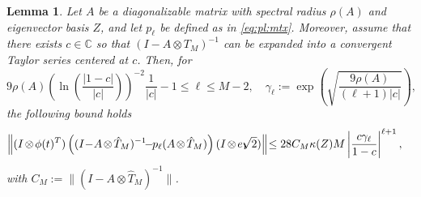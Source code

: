 \documentclass[final,1p,times,number]{elsarticle}
\theoremstyle{plain}%
\newtheorem{lem}[thm]{Lemma}
\begin{document}
\begin{lem}\label{lem:bound:mtx} Let $A$ be a diagonalizable matrix with spectral radius $\rho(A)$ and eigenvector basis $Z$, and let $p_\ell$ be defined as in \eqref{eq:pl:mtx}. Moreover, assume that there exists $c \in \mathbb{C}$ so that \((I-A\otimes T_{M})^{-1}\) can be expanded into a convergent Taylor series centered at $c$.
Then, for 
 \[ 9\rho(A) \left(\ln\left(\frac{|1-c|}{|c|}\right)\right)^{-2}\frac{1}{|c|} - 1 \leq \ell \leq M-2, \quad \gamma_\ell :=\exp\left(\sqrt{\frac{9\rho(A)}{(\ell+1)|c|}}\right), \]
the following bound holds
\begin{align*}
\left\|(I\hspace{-1pt}\otimes \hspace{-1pt}\phi(t)^T)\left( (I\hspace{-2pt}-\hspace{-2pt}A\hspace{-1pt}\otimes\hspace{-1pt}\hat{T}_{M})^{-1}\hspace{-4pt}-\hspace{-3pt}p_\ell(A\hspace{-1pt}\otimes\hspace{-1pt}\hat{T}_{M}) \right) (I\hspace{-1pt}\otimes\hspace{-1pt} e_1\hspace{-5pt} \sqrt{2})\right\|\hspace{-2pt} 
&\leq 28 C_M \kappa(Z) M \left| \frac{c\gamma_\ell}{1-c} \right| ^{\ell + 1}, 
\end{align*}
with \(C_M:= \| (I-A \otimes \hat{T}_{M})^{-1} \|\).
\end{lem}
\end{document}
